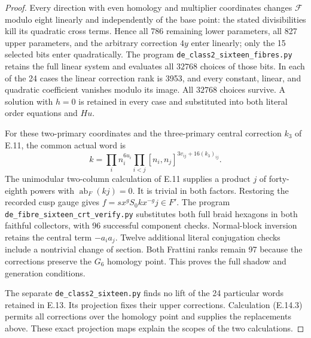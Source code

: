 \begin{proof}
Every direction with even homology and multiplier coordinates
changes $\mathcal F$ modulo eight linearly and independently
of the base point: the stated divisibilities kill its
quadratic cross terms. Hence all 786 remaining lower
parameters, all 827 upper parameters, and the arbitrary
correction $4y$ enter linearly; only the 15 selected bits
enter quadratically. The program
\texttt{de\_class2\_sixteen\_fibres.py} retains the full
linear system and evaluates all $32768$ choices of those
bits. In each of the 24 cases the linear correction rank
is 3953, and every constant, linear, and quadratic coefficient
vanishes modulo its image. All $32768$ choices survive.
A solution with $h=0$ is retained in every case and
substituted into both literal order equations and $Hu$.

For these two-primary coordinates and the three-primary
central correction $k_3$ of E.11, the common actual word is
\[
 k=\prod_i n_i^{6u_i}
       \prod_{i<j}[n_i,n_j]^{3v_{ij}+16(k_3)_{ij}}.
 \tag{E.14.4}
\]
The unimodular two-column calculation of E.11 supplies a
product $j$ of forty-eighth powers with
$\operatorname{ab}_F(kj)=0$. It is trivial in both factors.
Restoring the recorded cusp gauge gives
$f=sx^gS_0kx^{-g}j\in F'$.
The program \texttt{de\_fibre\_sixteen\_crt\_verify.py}
substitutes both full braid hexagons in both faithful
collectors, with 96 successful component checks.
Normal-block inversion retains the central term $-a_i a_j$.
Twelve additional literal conjugation checks include a
nontrivial change of section. Both Frattini ranks remain
97 because the corrections preserve the $G_6$ homology
point. This proves the full shadow and generation conditions.

The separate \texttt{de\_class2\_sixteen.py} finds no
lift of the 24 particular words retained in E.13. Its
projection fixes their upper corrections. Calculation
(E.14.3) permits all corrections over the homology point
and supplies the replacements above. These exact projection
maps explain the scopes of the two calculations.
\end{proof}

